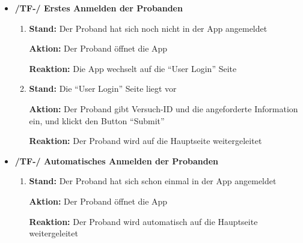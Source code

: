 \documentclass[a4paper]{scrreprt}
\begin{document}
            \begin{itemize}

            \item \textbf{/TF-/ Erstes Anmelden der \gls{Proband}en}
            \begin{enumerate}
                \item \par \textbf{Stand: }Der \gls{Proband} hat sich noch nicht in der App angemeldet
                \par \textbf{Aktion: }Der \gls{Proband} öffnet die App
                \par \textbf{Reaktion: }Die App wechselt auf die ``User Login'' Seite
                \item \par \textbf{Stand: }Die ``User Login'' Seite liegt vor
                \par \textbf{Aktion: }Der \gls{Proband} gibt Versuch-ID und die angeforderte Information ein, und klickt den Button ``Submit''
                \par \textbf{Reaktion: }Der \gls{Proband} wird auf die Hauptseite weitergeleitet
            \end{enumerate}

	        \item \textbf{/TF-/ Automatisches Anmelden der \gls{Proband}en}
	        \begin{enumerate}
	        	\item \par \textbf{Stand: }Der \gls{Proband} hat sich schon einmal in der App angemeldet
	        	\par \textbf{Aktion: }Der \gls{Proband} öffnet die App
	        	\par \textbf{Reaktion: }Der \gls{Proband} wird automatisch auf die Hauptseite weitergeleitet
	        \end{enumerate}


\end{itemize}
\end{document}
